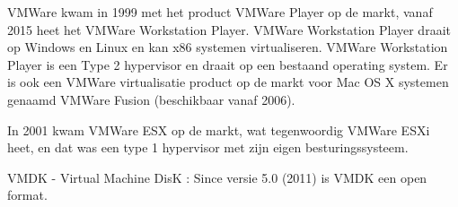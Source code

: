 VMWare kwam in 1999 met het product VMWare Player op de markt, vanaf 2015 heet het VMWare Workstation Player. VMWare Workstation Player draait op Windows en Linux en kan x86 systemen virtualiseren. VMWare Workstation Player is een Type 2 hypervisor en draait op een bestaand operating system. Er is ook een VMWare virtualisatie product op de markt voor Mac OS X systemen genaamd VMWare Fusion (beschikbaar vanaf 2006).

In 2001 kwam VMWare ESX op de markt, wat tegenwoordig VMWare ESXi heet, en dat was een type 1 hypervisor met zijn eigen besturingssysteem.

VMDK - Virtual Machine DisK : Since versie 5.0 (2011) is VMDK een open format.

